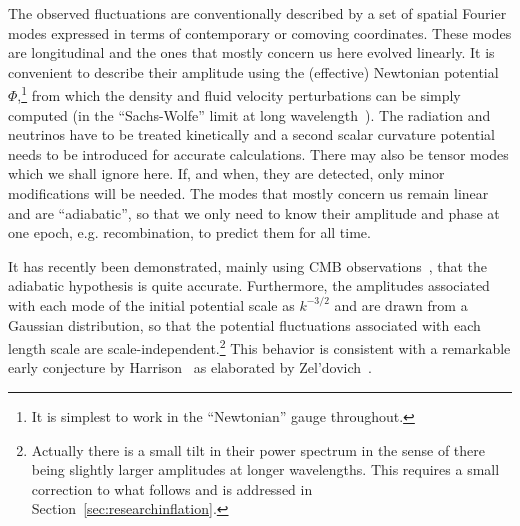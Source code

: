 \documentclass[psfig,11pt]{article}
\begin{document}
The observed fluctuations are conventionally described by a set of spatial Fourier modes expressed in terms of contemporary or comoving coordinates. These modes are longitudinal and the ones that mostly concern us here evolved linearly. It is convenient to describe their amplitude using the (effective) Newtonian potential $\Phi$,\footnote{It is simplest to work in the ``Newtonian'' gauge throughout.} from which the density and fluid velocity perturbations can be simply computed (in the ``Sachs-Wolfe'' limit at long wavelength~\cite{Sachs1967}). The radiation and neutrinos have to be treated kinetically and a second scalar curvature potential needs to be introduced for accurate calculations. There may also be tensor modes which we shall ignore here. If, and when, they are detected, only minor modifications will be needed. The modes that mostly concern us remain linear and are ``adiabatic'', so that we only need to know their amplitude and phase at one epoch, e.g. recombination, to predict them for all time.

It has recently been demonstrated, mainly using CMB observations~\cite{Planck2015cosmopara}, that the adiabatic hypothesis is quite accurate. Furthermore, the amplitudes associated with each mode of the initial potential scale as $k^{-3/2}$ and are drawn from a Gaussian distribution, so that the potential fluctuations associated with each length scale are scale-independent.\footnote{Actually there is a small tilt in their power spectrum in the sense of there being slightly larger amplitudes at longer wavelengths. This requires a small correction to what follows and is addressed in Section~\ref{sec:researchinflation}.} This behavior is consistent with a remarkable early conjecture by Harrison~\cite{Harrison1970} as elaborated by Zel'dovich~\cite{Zeldovich1972}.
\end{document}
